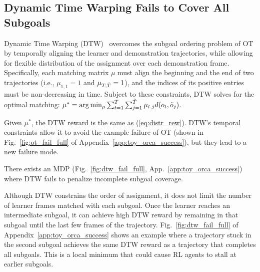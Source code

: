 
\subsection{Dynamic Time Warping Fails to Cover All Subgoals}
\label{subsec:dtw_fail}
Dynamic Time Warping (DTW)~\cite{dtw} overcomes the subgoal ordering problem of OT by temporally aligning the learner and demonstration trajectories, while allowing for flexible distribution of the assignment over each demonstration frame.
Specifically, each matching matrix $\mu$ must align the beginning and the end of two trajectories (i.e., $\mu_{1, 1} = 1$ and $\mu_{T, \tilde{T}} = 1$),
and the indices of its positive entries must be non-decreasing in time.
Subject to these constraints, DTW solves for the optimal matching:
$\mu^* = \arg\min_\mu \sum_{t=1}^{T} \sum_{j=1}^{\tilde{T}} \mu_{t,j} d(o_t, \tilde{o}_j)$.

Given $\mu^*$, the DTW reward is the same as (\ref{eq:distr_rew}).
DTW's temporal constraints allow it to avoid the example failure of OT (shown in Fig.~\ref{fig:ot_fail_full} of Appendix~\ref{app:toy_orca_success}), but they lead to a new failure mode.

\begin{counterexample}
There exists an MDP (Fig.~\ref{fig:dtw_fail_full}, App.~\ref{app:toy_orca_success}) where DTW fails to penalize incomplete subgoal coverage.
\end{counterexample}
Although DTW constrains the order of assignment, it does not limit the number of learner frames matched with each subgoal. Once the learner reaches an intermediate subgoal, it can achieve high DTW reward by remaining in that subgoal until the last few frames of the trajectory. Fig.~\ref{fig:dtw_fail_full} of Appendix~\ref{app:toy_orca_success} shows an example where a trajectory stuck in the second subgoal achieves the same DTW reward as a trajectory that completes all subgoals. This is a local minimum that could cause RL agents to stall at earlier subgoals.  


